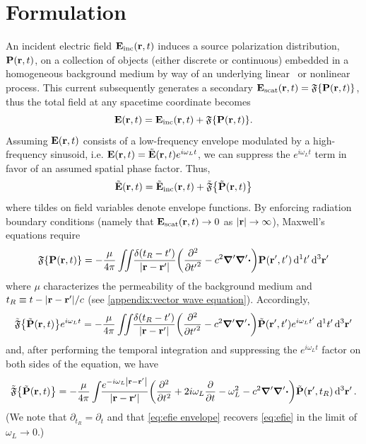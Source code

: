 \section{Formulation}

An incident electric field $\vb{E}_\text{inc}(\vb{r}, t)$ induces a source polarization distribution, $\vb{P}(\vb{r}, t)$, on a collection of objects (either discrete or continuous) embedded in a homogeneous background medium by way of an underlying linear~\cite{} or nonlinear~\cite{Glosser2017} process.
This current subsequently generates a secondary $\vb{E}_\text{scat}(\vb{r}, t) = \mathfrak{F}\qty{\vb{P}(\vb{r}, t)}$, thus the total field at any spacetime coordinate becomes
\begin{equation}
  \vb{E}(\vb{r}, t) = \vb{E}_\text{inc}(\vb{r}, t) + \mathfrak{F}\qty{\vb{P}(\vb{r}, t)}.
\end{equation}
Assuming $\vb{E}(\vb{r}, t)$ consists of a low-frequency envelope modulated by a high-frequency sinusoid, i.e. $\vb{E}(\vb{r}, t) = \tilde{\vb{E}}(\vb{r}, t) e^{i \omega_L t}$, we can suppress the $e^{i \omega_L t}$ term in favor of an assumed spatial phase factor.
Thus,
\begin{equation}
  \tilde{\vb{E}}(\vb{r}, t) = \tilde{\vb{E}}_\text{inc}(\vb{r}, t) + \tilde{\mathfrak{F}}\qty{\tilde{\vb{P}}(\vb{r}, t)}
\end{equation}
where tildes on field variables denote envelope functions.
By enforcing radiation boundary conditions (namely that $\vb{E}_\text{scat}(\vb{r}, t) \to 0$ as $\abs{\vb{r}} \to \infty$), Maxwell's equations require
\begin{equation}
  \mathfrak{F}\qty{\vb{P}(\vb{r}, t)} = -\frac{\mu}{4\pi} \iint_{} \kern0.1em \frac{\delta(t_R - t')}{\abs{\vb{r} - \vb{r}'}} \qty(\pdv[2]{{t'}} - c^2 \grad' \grad'\boldsymbol{\cdot}) \vb{P}(\vb{r}', t') \dd[1]{t'} \dd[3]{\vb{r}'}
  \label{eq:efie}
\end{equation}
where $\mu$ characterizes the permeability of the background medium and $t_R \equiv t - \abs{\vb{r} - \vb{r}'}/c$ (see \cref{appendix:vector wave equation}).
Accordingly,
\begin{equation}
  \tilde{\mathfrak{F}}\qty{\tilde{\vb{P}}(\vb{r}, t)}e^{i \omega_L t} = -\frac{\mu}{4\pi} \iint_{} \kern0.1em \frac{\delta(t_R - t')}{\abs{\vb{r} - \vb{r}'}} \qty(\pdv[2]{{t'}} - c^2 \grad' \grad'\boldsymbol{\cdot}) \tilde{\vb{P}}(\vb{r}', t') e^{i \omega_L t'} \dd[1]{t'} \dd[3]{\vb{r}'}
  \label{eq:efie envelope}
\end{equation}
and, after performing the temporal integration and suppressing the $e^{i \omega_L t}$ factor on both sides of the equation, we have
\begin{equation}
  \tilde{\mathfrak{F}}\qty{\tilde{\vb{P}}(\vb{r}, t)} = -\frac{\mu}{4\pi} \int_{} \kern0.1em \frac{e^{- i \omega_L \abs{\vb{r} - \vb{r}'}}}{\abs{\vb{r} - \vb{r}'}} \qty(\pdv[2]{t} + 2 i \omega_L \pdv{t} - \omega_L^2 - c^2 \grad' \grad'\boldsymbol{\cdot}) \tilde{\vb{P}}(\vb{r}', t_R) \dd[3]{\vb{r}'}.
  \label{eq:efie envelope}
\end{equation}
(We note that $\partial_{t_R} = \partial_{t}$ and that \cref{eq:efie envelope} recovers \cref{eq:efie} in the limit of $\omega_L \to 0$.)

